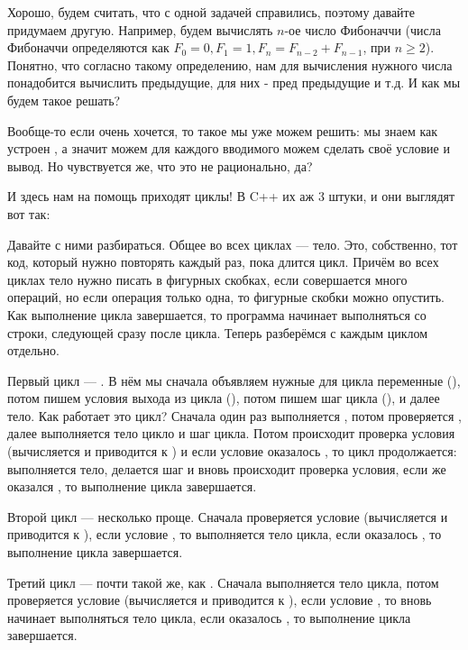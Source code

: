 
Хорошо, будем считать, что с одной задачей справились, поэтому давайте придумаем другую. Например, будем вычислять $n$-ое число Фибоначчи (числа Фибоначчи определяются как $F_0 = 0, F_1 = 1, F_n = F_{n - 2} + F_{n - 1}$, при $n \ge 2$). Понятно, что согласно такому определению, нам для вычисления нужного числа понадобится вычислить предыдущие, для них - пред предыдущие и т.д. И как мы будем такое решать?

Вообще-то если очень хочется, то такое мы уже можем решить: мы знаем как устроен , а значит можем для каждого вводимого  можем сделать своё условие и вывод. Но чувствуется же, что это не рационально, да?

И здесь нам на помощь приходят циклы! В C++ их аж 3 штуки, и они выглядят вот так:


Давайте с ними разбираться. Общее во всех циклах — тело. Это, собственно, тот код, который нужно повторять каждый раз, пока длится цикл. Причём во всех циклах тело нужно писать в фигурных скобках, если совершается много операций, но если операция только одна, то фигурные скобки можно опустить. Как выполнение цикла завершается, то программа начинает выполняться со строки, следующей сразу после цикла. Теперь разберёмся с каждым циклом отдельно.

Первый цикл — . В нём мы сначала объявляем нужные для цикла переменные (), потом пишем условия выхода из цикла (), потом пишем шаг цикла (), и далее тело. Как работает это цикл? Сначала один раз выполняется , потом проверяется , далее выполняется тело цикло и шаг цикла. Потом происходит проверка условия (вычисляется  и приводится к ) и если условие оказалось , то цикл продолжается: выполняется тело, делается шаг и вновь происходит проверка условия, если же  оказался , то выполнение цикла завершается.

Второй цикл —  несколько проще. Сначала проверяется условие (вычисляется  и приводится к ), если условие , то выполняется тело цикла, если оказалось , то выполнение цикла завершается.

Третий цикл —  почти такой же, как . Сначала выполняется тело цикла, потом проверяется условие (вычисляется  и приводится к ), если условие , то вновь начинает выполняться тело цикла, если оказалось , то выполнение цикла завершается.

